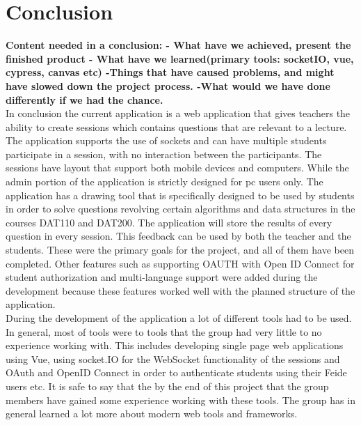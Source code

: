 \section{Conclusion}
\textbf{Content needed in a conclusion:
- What have we achieved, present the finished product
- What have we learned(primary tools: socketIO, vue, cypress, canvas etc)
-Things that have caused problems, and might have slowed down the project process.
-What would we have done differently if we had the chance.}
\\[11pt]
In conclusion the current application is a web application that gives teachers the ability to create sessions which contains questions that are relevant to a lecture. The application supports the use of sockets and can have multiple students participate in a session, with no interaction between the participants.  The sessions have layout that support both mobile devices and computers. While the admin portion of the application is strictly designed for pc users only. The application has a drawing tool that is specifically designed to be used by students in order to solve questions revolving certain algorithms and data structures in the courses DAT110 and DAT200. The application will store the results of every question in every session. This feedback can be used by both the teacher and the students. These were the primary goals for the project, and all of them have been completed. Other features such as supporting OAUTH with Open ID Connect for student authorization and multi-language support were added during the development because these features worked well with the planned structure of the application. \\[11pt]
During the development of the application a lot of different tools had to be used. In general, most of tools were to tools that the group had very little to no experience working with. This includes developing single page web applications using Vue, using socket.IO for the WebSocket functionality of the sessions and OAuth and OpenID Connect in order to authenticate students using their Feide users etc. It is safe to say that the by the end of this project that the group members have gained some experience working with these tools. The group has in general learned a lot more about modern web tools and frameworks. \\[11pt]

